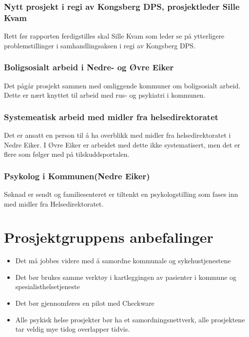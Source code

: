 \documentclass[11pt]{report} %
\begin{document}
                  \subsubsection{Nytt prosjekt i regi av Kongsberg DPS, prosjektleder Sille Kvam}
                    Rett før rapporten ferdigstilles skal Sille Kvam som leder se på ytterligere problemstillinger i samhandlingsaksen i regi av Kongsberg DPS. 
                  \subsubsection{Boligsosialt arbeid i Nedre- og Øvre Eiker}
                    Det pågår prosjekt sammen med omliggende kommuner om boligsosialt arbeid. Dette er nært knyttet til arbeid med rus- og psykiatri i kommunen.
                  \subsubsection{Systemeatisk arbeid med midler fra helsedirektoratet}
                    Det er ansatt en person til å ha overblikk med midler fra helsedirektoratet i Nedre Eiker. I Øvre Eiker er arbeidet med dette ikke systematisert, men det er flere som følger med på tilskuddsportalen.
                  \subsubsection{Psykolog i Kommunen(Nedre Eiker)}
                    Søknad er sendt og familiesenteret er tiltenkt en psykologstilling som fases inn med midler fra Helsedirektoratet.
                \section{Prosjektgruppens anbefalinger}\label{chap:vvidere_anbef}
                  \begin{itemize}
                    \item Det må jobbes videre med å samordne kommunale og sykehustjenestene\\
                    \item Det bør brukes samme verktøy i kartleggingen av pasienter i kommune og spesialisthelsetjeneste\\
                    \item Det bør gjennomføres en pilot med Checkware\\
                    \item Alle psykisk helse prosjekter bør ha et samordningsnettverk, alle prosjektene tar veldig mye tidog overlapper tidvis.\\
                  \end{itemize}
\end{document}
